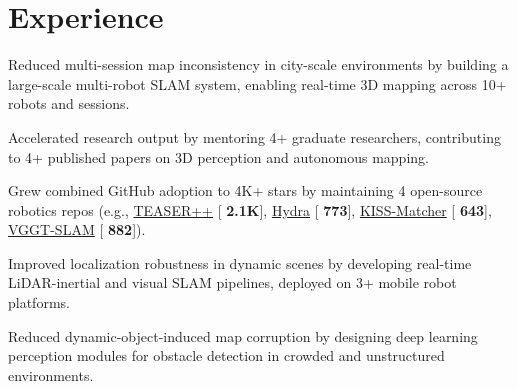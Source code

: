 \documentclass[]{deedy-resume-openfont}
\newcommand{\githubstars}[1]{[{\faGithubSquare}\,\ding{72}\,\textbf{#1}]}
\begin{document}
\begin{minipage}[t]{0.66\textwidth}

%
%
\section{Experience}

\vspace{0.3cm}
\begin{tightemize}
\item Reduced multi-session map inconsistency in city-scale environments by building a large-scale multi-robot SLAM system, enabling real-time 3D mapping across 10+ robots and sessions.
\item Accelerated research output by mentoring 4+ graduate researchers, contributing to 4+ published papers on 3D perception and autonomous mapping.
\item Grew combined GitHub adoption to 4K+ stars by maintaining 4 open-source robotics repos (e.g., \href{https://github.com/MIT-SPARK/TEASER-plusplus}{TEASER++} \githubstars{2.1K}, \href{https://github.com/MIT-SPARK/Hydra}{Hydra} \githubstars{773}, \href{https://github.com/MIT-SPARK/KISS-Matcher}{KISS-Matcher} \githubstars{643}, \href{https://github.com/MIT-SPARK/VGGT-SLAM}{VGGT-SLAM} \githubstars{882}).
\end{tightemize}
\sectionsep

\begin{tightemize}
\item Improved localization robustness in dynamic scenes by developing real-time LiDAR-inertial and visual SLAM pipelines, deployed on 3+ mobile robot platforms.
\item Reduced dynamic-object-induced map corruption by designing deep learning perception modules for obstacle detection in crowded and unstructured environments.
\end{tightemize}
\sectionsep


\end{minipage}
\end{document}
